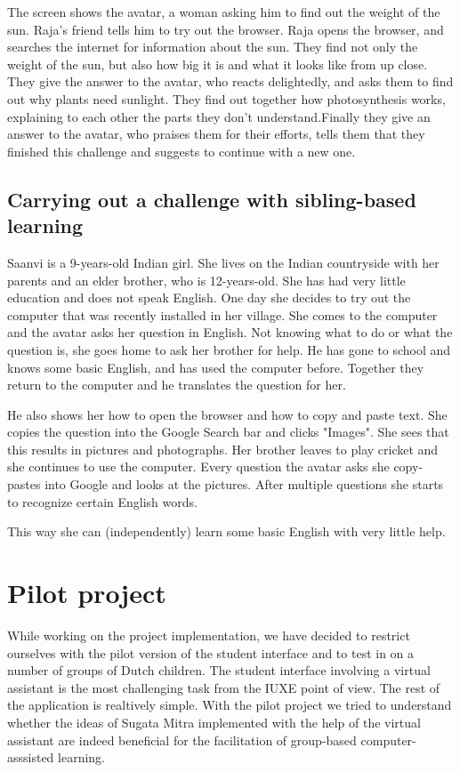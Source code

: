 \documentclass[a4paper]{article}
\begin{document}
The screen shows the avatar, a woman asking him to find out the weight of the sun. Raja's friend tells him to try out the browser. Raja opens the browser, and searches the internet for information about the sun. They find not only the weight of the sun, but also how big it is and what it looks like from up close. They give the answer to the avatar, who reacts delightedly, and asks them to find out why plants need sunlight. They find out together how photosynthesis works, explaining to each other the parts they don't understand.Finally they give an answer to the avatar, who praises them for their efforts, tells them that they finished this challenge and suggests to continue with a new one. 

\subsection{Carrying out a challenge with sibling-based learning} 

Saanvi is a 9-years-old Indian girl. She lives on the Indian countryside with her parents and an elder brother, who is 12-years-old. She has had very little education and does not speak English. One day she decides to try out the computer that was recently installed in her village. She comes to the computer and the avatar asks her question in English. Not knowing what to do or what the question is, she goes home to ask her brother for help. He has gone to school and knows some basic English, and has used the computer before. Together they return to the computer and he translates the question for her. 

He also shows her how to open the browser and how to copy and paste text. She copies the question into the Google Search bar and clicks "Images". She sees that this results in pictures and photographs. Her brother leaves to play cricket and she continues to use the computer. Every question the avatar asks she copy-pastes into Google and looks at the pictures. After multiple questions she starts to recognize certain English words.

This way she can (independently) learn some basic English with very little help. 

\section{Pilot project}

While working on the project implementation, we have decided to restrict ourselves with the pilot version of the student interface and to test in on a number of groups of Dutch children. The student interface involving a virtual assistant is the most challenging task from the IUXE point of view. The rest of the application is realtively simple. With the pilot project we tried to understand whether the ideas of Sugata Mitra implemented with the help of the virtual assistant are indeed beneficial for the facilitation of group-based computer-asssisted learning.
\end{document}
